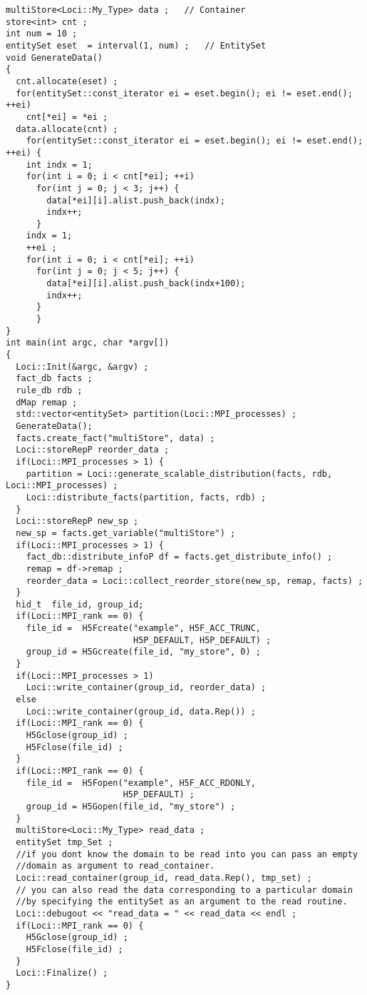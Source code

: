 \begin{verbatim}
multiStore<Loci::My_Type> data ;   // Container
store<int> cnt ;
int num = 10 ;
entitySet eset  = interval(1, num) ;   // EntitySet
void GenerateData()
{
  cnt.allocate(eset) ;
  for(entitySet::const_iterator ei = eset.begin(); ei != eset.end(); ++ei)
    cnt[*ei] = *ei ;
  data.allocate(cnt) ;
    for(entitySet::const_iterator ei = eset.begin(); ei != eset.end(); ++ei) {
    int indx = 1;
    for(int i = 0; i < cnt[*ei]; ++i)
      for(int j = 0; j < 3; j++) {
        data[*ei][i].alist.push_back(indx);
        indx++;
      }
    indx = 1;
    ++ei ;
    for(int i = 0; i < cnt[*ei]; ++i)
      for(int j = 0; j < 5; j++) {
        data[*ei][i].alist.push_back(indx+100);
        indx++;
      }
      }
}
int main(int argc, char *argv[])
{ 
  Loci::Init(&argc, &argv) ;
  fact_db facts ;
  rule_db rdb ;
  dMap remap ;
  std::vector<entitySet> partition(Loci::MPI_processes) ;
  GenerateData();
  facts.create_fact("multiStore", data) ;
  Loci::storeRepP reorder_data ;
  if(Loci::MPI_processes > 1) {
    partition = Loci::generate_scalable_distribution(facts, rdb, Loci::MPI_processes) ;
    Loci::distribute_facts(partition, facts, rdb) ;
  }
  Loci::storeRepP new_sp ;
  new_sp = facts.get_variable("multiStore") ;
  if(Loci::MPI_processes > 1) {
    fact_db::distribute_infoP df = facts.get_distribute_info() ;
    remap = df->remap ;
    reorder_data = Loci::collect_reorder_store(new_sp, remap, facts) ;
  }
  hid_t  file_id, group_id;
  if(Loci::MPI_rank == 0) {
    file_id =  H5Fcreate("example", H5F_ACC_TRUNC,
                         H5P_DEFAULT, H5P_DEFAULT) ;
    group_id = H5Gcreate(file_id, "my_store", 0) ;
  }
  if(Loci::MPI_processes > 1)
    Loci::write_container(group_id, reorder_data) ;
  else
    Loci::write_container(group_id, data.Rep()) ;
  if(Loci::MPI_rank == 0) {
    H5Gclose(group_id) ;
    H5Fclose(file_id) ;
  }
  if(Loci::MPI_rank == 0) {
    file_id =  H5Fopen("example", H5F_ACC_RDONLY,
                       H5P_DEFAULT) ;
    group_id = H5Gopen(file_id, "my_store") ;
  }
  multiStore<Loci::My_Type> read_data ;
  entitySet tmp_Set ; 
  //if you dont know the domain to be read into you can pass an empty
  //domain as argument to read_container. 
  Loci::read_container(group_id, read_data.Rep(), tmp_set) ;
  // you can also read the data corresponding to a particular domain
  //by specifying the entitySet as an argument to the read routine.  
  Loci::debugout << "read_data = " << read_data << endl ;
  if(Loci::MPI_rank == 0) {
    H5Gclose(group_id) ;
    H5Fclose(file_id) ;
  }
  Loci::Finalize() ;
}
 
\end{verbatim} 

